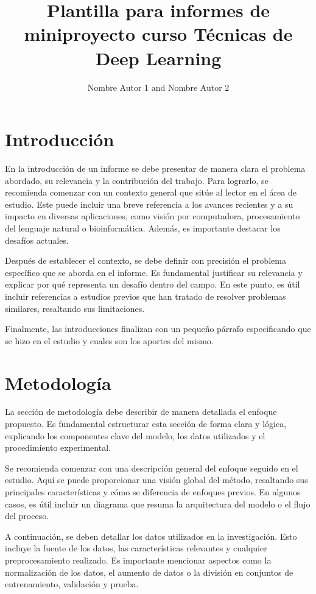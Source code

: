 \documentclass[letterpaper, 10 pt, conference]{ieeeconf}  %
\title{\LARGE \bf
Plantilla para informes de miniproyecto curso Técnicas de Deep Learning
}
\author{Nombre Autor 1 and Nombre Autor 2 }
\begin{document}
\maketitle
\thispagestyle{empty}
\pagestyle{empty}



\section{Introducción}
En la introducción de un informe se debe presentar de manera clara el problema abordado, su relevancia y la contribución del trabajo. Para lograrlo, se recomienda comenzar con un contexto general que sitúe al lector en el área de estudio. Este puede incluir una breve referencia a los avances recientes y a su impacto en diversas aplicaciones, como visión por computadora, procesamiento del lenguaje natural o bioinformática. Además, es importante destacar los desafíos actuales.

Después de establecer el contexto, se debe definir con precisión el problema específico que se aborda en el informe. Es fundamental justificar su relevancia y explicar por qué representa un desafío dentro del campo. En este punto, es útil incluir referencias a estudios previos que han tratado de resolver problemas similares, resaltando sus limitaciones.

Finalmente, las introducciones finalizan con un pequeño párrafo especificando que se hizo en el estudio y cuales son los aportes del mismo. 


\section{Metodología}
La sección de metodología debe describir de manera detallada el enfoque propuesto. Es fundamental estructurar esta sección de forma clara y lógica, explicando los componentes clave del modelo, los datos utilizados y el procedimiento experimental.  

Se recomienda comenzar con una descripción general del enfoque seguido en el estudio. Aquí se puede proporcionar una visión global del método, resaltando sus principales características y cómo se diferencia de enfoques previos. En algunos casos, es útil incluir un diagrama que resuma la arquitectura del modelo o el flujo del proceso.  

A continuación, se deben detallar los datos utilizados en la investigación. Esto incluye la fuente de los datos, las características relevantes y cualquier preprocesamiento realizado. Es importante mencionar aspectos como la normalización de los datos, el aumento de datos o la división en conjuntos de entrenamiento, validación y prueba. 
\end{document}
